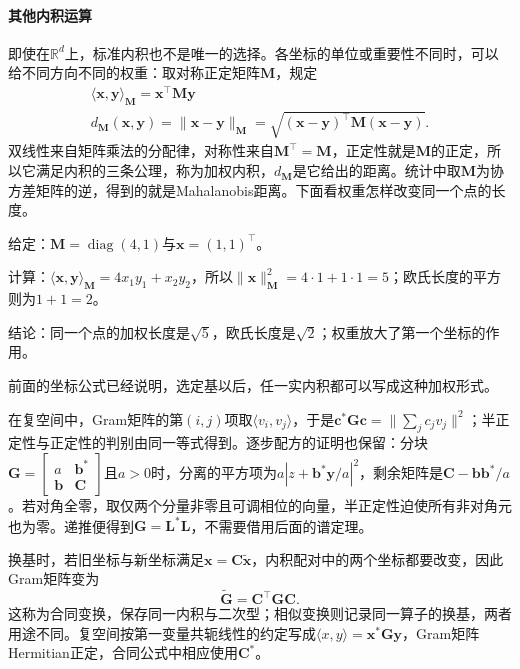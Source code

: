 \paragraph{其他内积运算}
\label{sec:ls-weighted-inner-products}
即使在$\mathbb R^d$上，标准内积也不是唯一的选择。各坐标的单位或重要性不同时，可以给不同方向不同的权重：取对称正定矩阵$\bm M$，规定
\begin{equation}
\begin{gathered}
\langle\bm x,\bm y\rangle_{\bm M}=\bm x^\top\bm M\bm y\\
d_{\bm M}(\bm x,\bm y)=\lVert\bm x-\bm y\rVert_{\bm M}=\sqrt{(\bm x-\bm y)^\top\bm M(\bm x-\bm y)}.
\end{gathered}
\label{eq:linear-algebra-mahalanobis-pseudodistance}
\end{equation}
双线性来自矩阵乘法的分配律，对称性来自$\bm M^\top=\bm M$，正定性就是$\bm M$的正定，所以它满足内积的三条公理，称为加权内积，$d_{\bm M}$是它给出的距离。统计中取$\bm M$为协方差矩阵的逆，得到的就是Mahalanobis距离。下面看权重怎样改变同一个点的长度。
\begin{example}[加权内积下的长度]
\label{ex:ls-weighted-length}
给定：$\bm M=\operatorname{diag}(4,1)$与$\bm x=(1,1)^\top$。

计算：$\langle\bm x,\bm y\rangle_{\bm M}=4x_1y_1+x_2y_2$，所以$\lVert\bm x\rVert_{\bm M}^2=4\cdot1+1\cdot1=5$；欧氏长度的平方则为$1+1=2$。

结论：同一个点的加权长度是$\sqrt5$，欧氏长度是$\sqrt2$；权重放大了第一个坐标的作用。
\end{example}
前面的坐标公式已经说明，选定基以后，任一实内积都可以写成这种加权形式。


在复空间中，Gram矩阵的第$(i,j)$项取$\langle v_i,v_j\rangle$，于是$\bm c^*\bm G\bm c=\|\sum_jc_jv_j\|^2$；半正定性与正定性的判别由同一等式得到。逐步配方的证明也保留：分块$\bm G=\left[\begin{smallmatrix}a&\bm b^*\\\bm b&\bm C\end{smallmatrix}\right]$且$a>0$时，分离的平方项为$a|z+\bm b^*\bm y/a|^2$，剩余矩阵是$\bm C-\bm b\bm b^*/a$。若对角全零，取仅两个分量非零且可调相位的向量，半正定性迫使所有非对角元也为零。递推便得到$\bm G=\bm L^*\bm L$，不需要借用后面的谱定理。

换基时，若旧坐标与新坐标满足$\bm x=\bm C\widetilde{\bm x}$，内积配对中的两个坐标都要改变，因此Gram矩阵变为
\[
 \widetilde{\bm G}=\bm C^\top\bm G\bm C.
\]
这称为合同变换，保存同一内积与二次型；相似变换则记录同一算子的换基，两者用途不同。复空间按第一变量共轭线性的约定写成$\langle x,y\rangle=\bm x^*\bm G\bm y$，Gram矩阵Hermitian正定，合同公式中相应使用$\bm C^*$。

